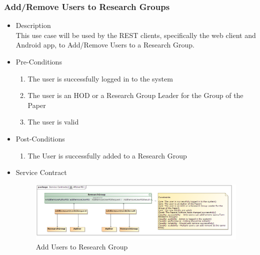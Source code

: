\documentclass[a4paper,10pt]{article}
\begin{document}
\subsubsection{Add/Remove Users to Research Groups}
	\begin{itemize}
		\item Description\\
			This use case will be used by the REST clients, specifically the web client and Android app, to Add/Remove Users to a  Research Group.
		\item Pre-Conditions
			\begin{enumerate}
				\item The user is successfully logged in to the system
				\item The user is an HOD or a Research Group Leader for the Group of the Paper
				\item The user is valid
			\end{enumerate}
		\item Post-Conditions
			\begin{enumerate}
				\item The User is successfully added to a Research Group
						
			\end{enumerate}
		\item Service Contract
		\begin{figure}[H]
			\includegraphics[scale=0.5]{ARUserRG}
			\caption{Add Users to Research Group}
		\end{figure}
	\end{itemize}
\end{document}
